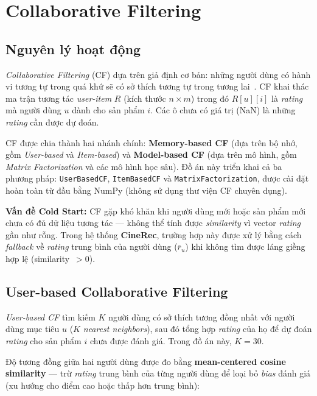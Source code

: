 \documentclass[../BTL.tex]{subfiles}
\begin{document}
\section{Collaborative Filtering}
\label{section:2.2}

\subsection{Nguyên lý hoạt động}
\label{section:2.2.1}

\textit{Collaborative Filtering} (CF) dựa trên giả định cơ bản: những người dùng có
hành vi tương tự trong quá khứ sẽ có sở thích tương tự trong tương
lai~\cite{sarwar2001item}. CF khai thác ma trận tương tác \textit{user-item} $R$
(kích thước $n \times m$) trong đó $R[u][i]$ là \textit{rating} mà người dùng $u$
dành cho sản phẩm $i$. Các ô chưa có giá trị (NaN) là những \textit{rating} cần
được dự đoán.

CF được chia thành hai nhánh chính: \textbf{Memory-based CF} (dựa trên bộ nhớ, gồm
\textit{User-based} và \textit{Item-based}) và \textbf{Model-based CF} (dựa trên mô
hình, gồm \textit{Matrix Factorization} và các mô hình học sâu). Đồ án này triển
khai cả ba phương pháp: \texttt{UserBasedCF}, \texttt{ItemBasedCF} và
\texttt{MatrixFactorization}, được cài đặt hoàn toàn từ đầu bằng NumPy (không sử
dụng thư viện CF chuyên dụng).

\textbf{Vấn đề Cold Start:} CF gặp khó khăn khi người dùng mới hoặc sản phẩm mới
chưa có đủ dữ liệu tương tác — không thể tính được \textit{similarity} vì vector
\textit{rating} gần như rỗng. Trong hệ thống \textbf{CineRec}, trường hợp này được
xử lý bằng cách \textit{fallback} về \textit{rating} trung bình của người dùng
($\bar{r}_u$) khi không tìm được láng giềng hợp lệ (similarity~$> 0$).

\subsection{User-based Collaborative Filtering}
\label{section:2.2.2}

\textit{User-based CF} tìm kiếm $K$ người dùng có sở thích tương đồng nhất với
người dùng mục tiêu $u$ ($K$ \textit{nearest neighbors}), sau đó tổng hợp
\textit{rating} của họ để dự đoán \textit{rating} cho sản phẩm $i$ chưa được đánh
giá. Trong đồ án này, $K = 30$.

Độ tương đồng giữa hai người dùng được đo bằng \textbf{mean-centered cosine
similarity} — trừ \textit{rating} trung bình của từng người dùng để loại bỏ
\textit{bias} đánh giá (xu hướng cho điểm cao hoặc thấp hơn trung bình):
\end{document}
